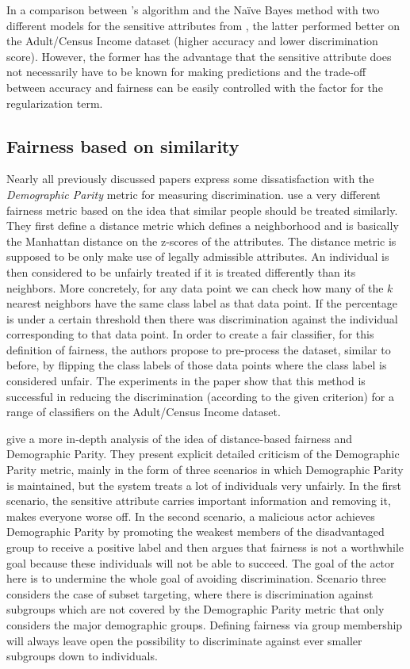 In a comparison between \citet{kamishima2011fairness}'s algorithm
and the Na\"ive Bayes method with two different models for the sensitive attributes from \citet{calders2010three},
the latter performed better on the Adult/Census Income dataset
(higher accuracy and lower discrimination score).
However, the former has the advantage
that the sensitive attribute does not necessarily have to be known for making predictions
and the trade-off between accuracy and fairness can be easily controlled
with the factor for the regularization term.

\subsection{Fairness based on similarity}%
\label{fairness-based-on-similarity}
Nearly all previously discussed papers express some dissatisfaction
with the \emph{Demographic Parity} metric for measuring discrimination.
\citet{luong2011k} use a very different fairness metric
based on the idea that similar people should be treated similarly.
They first define a distance metric which defines a neighborhood
and is basically the Manhattan distance on the z-scores of the attributes.
The distance metric is supposed to be only make use of legally admissible attributes.
An individual is then considered to be unfairly treated
if it is treated differently than its neighbors.
More concretely, for any data point we can check
how many of the \(k\) nearest neighbors have the same class label as that data point.
If the percentage is under a certain threshold
then there was discrimination against the individual corresponding to that data point.
In order to create a fair classifier, for this definition of fairness,
the authors propose to pre-process the dataset,
similar to \citet{kamiran2009classifying} before,
by flipping the class labels of those data points where the class label is considered unfair.
The experiments in the paper show that this method is successful in reducing the discrimination
(according to the given criterion)
for a range of classifiers on the Adult/Census Income dataset.

\citet{dwork2012fairness} give a more in-depth analysis
of the idea of distance-based fairness and Demographic Parity.
They present explicit detailed criticism of the Demographic Parity metric,
mainly in the form of three scenarios in which Demographic Parity is maintained,
but the system treats a lot of individuals very unfairly.
In the first scenario, the sensitive attribute carries important information
and removing it, makes everyone worse off.
In the second scenario, a malicious actor achieves Demographic Parity
by promoting the weakest members of the disadvantaged group to receive a positive label
and then argues that fairness is not a worthwhile goal
because these individuals will not be able to succeed.
The goal of the actor here is to undermine the whole goal of avoiding discrimination.
Scenario three considers the case of subset targeting,
where there is discrimination against subgroups
which are not covered by the Demographic Parity metric
that only considers the major demographic groups.
Defining fairness via group membership will always leave open the possibility
to discriminate against ever smaller subgroups down to individuals.

